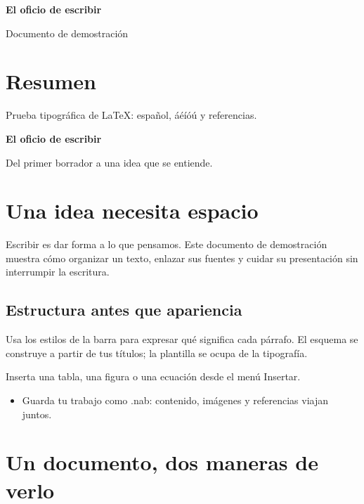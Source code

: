 \documentclass[12pt,a4paper,oneside,openany]{book}
\begin{document}
\begin{titlepage}\centering\vspace*{3cm}
{\LARGE\bfseries El oficio de escribir\par}
\vspace{1cm}\par
\vfill Documento de demostración\par \par 
\end{titlepage}
\chapter*{Resumen}
Prueba tipográfica de \LaTeX{}: español, áéíóú y referencias.
\fontsize{12.0}{14.399999999999999}\selectfont
{\LARGE\bfseries El oficio de escribir\par}

{\large Del primer borrador a una idea que se entiende.\par}

\chapter{Una idea necesita espacio}\label{b8E82C867-827A-4F6D-B47D-1D8374B573B4}

Escribir es dar forma a lo que pensamos. Este documento de demostración muestra cómo organizar un texto, enlazar sus fuentes y cuidar su presentación sin interrumpir la escritura.

\section{Estructura antes que apariencia}\label{b2247A818-C51A-462F-8E5B-8ADC05C9C695}

Usa los estilos de la barra para expresar qué significa cada párrafo. El esquema se construye a partir de tus títulos; la plantilla se ocupa de la tipografía.

Inserta una tabla, una figura o una ecuación desde el menú Insertar.

\begin{itemize}
\item Guarda tu trabajo como .nab: contenido, imágenes y referencias viajan juntos.

\end{itemize}
\chapter{Un documento, dos maneras de verlo}\label{b10B5A779-ABE4-4184-86E0-1E0B6FDB0CB5}
\end{document}
